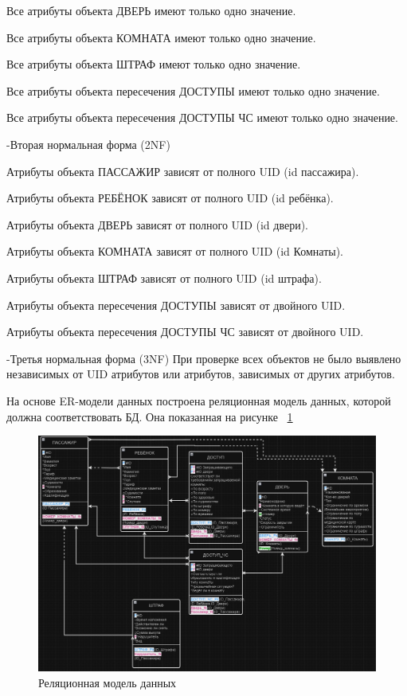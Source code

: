 Все атрибуты объекта ДВЕРЬ имеют только одно значение.

Все атрибуты объекта КОМНАТА имеют только одно значение.

Все атрибуты объекта ШТРАФ имеют только одно значение.

Все атрибуты объекта пересечения ДОСТУПЫ имеют только одно значение.

Все атрибуты объекта пересечения ДОСТУПЫ ЧС имеют только одно значение.


-Вторая нормальная форма (2NF)

Атрибуты объекта ПАССАЖИР зависят от полного UID (id пассажира).

Атрибуты объекта РЕБЁНОК зависят от полного UID (id ребёнка).

Атрибуты объекта ДВЕРЬ зависят от полного UID (id двери).

Атрибуты объекта КОМНАТА зависят от полного UID (id Комнаты).

Атрибуты объекта ШТРАФ зависят от полного UID (id штрафа).

Атрибуты объекта пересечения ДОСТУПЫ зависят от двойного UID.

Атрибуты объекта пересечения ДОСТУПЫ ЧС зависят от двойного UID.


-Третья нормальная форма (3NF)
При проверке всех объектов не было выявлено независимых от UID атрибутов или атрибутов, зависимых от других атрибутов.

На основе ER-модели данных построена реляционная модель данных, которой должна соответствовать БД. Она показанная на рисунке  ~\ref{fig:commonscheme3}

\begin{figure}
	\centering
	\includegraphics[width=1\linewidth]{images/CommonScheme3}
	\caption{Реляционная модель данных}
	\label{fig:commonscheme3}
\end{figure}

